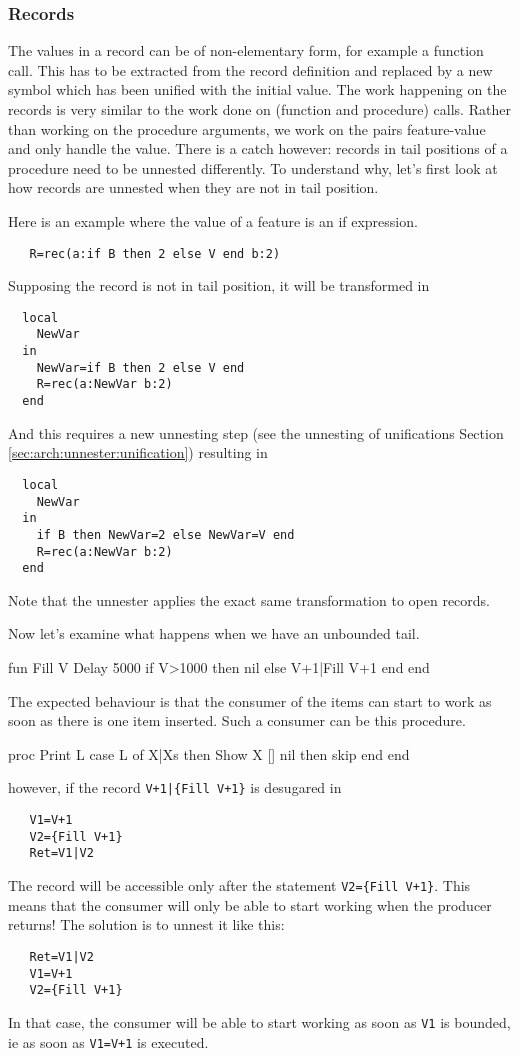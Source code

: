 \documentclass[a4paper]{memoir}
\begin{document}
\subsubsection{Records}\label{sec:arch:unnester:records}
The values in a record can be of non-elementary form, for example a function call. This has to be extracted from the record definition and replaced by a new symbol which has been unified with the initial value. The work happening on the records is very similar to the work done on (function and procedure) calls. Rather than working on the procedure arguments, we work on the pairs feature-value and only handle the value. 
There is a catch however: records in tail positions of a procedure need to be unnested
differently. To understand why, let's first look at how records are unnested
when they are not in tail position.

Here is an example where the value of a feature is an if expression.
\begin{lstlisting}
   R=rec(a:if B then 2 else V end b:2)
\end{lstlisting}
Supposing the record is not in tail position, it will be transformed in
\begin{lstlisting}
  local
    NewVar
  in
    NewVar=if B then 2 else V end
    R=rec(a:NewVar b:2)
  end
\end{lstlisting}
And this requires a new unnesting step (see the unnesting of unifications Section \ref{sec:arch:unnester:unification}) resulting in 
\begin{lstlisting}
  local
    NewVar
  in
    if B then NewVar=2 else NewVar=V end
    R=rec(a:NewVar b:2)
  end
\end{lstlisting}

Note that the unnester applies the exact same transformation to open records.

Now let's examine what happens when we have an unbounded tail.

   fun {Fill V}
      {Delay 5000} %
      if V>1000 then
	      nil
      else
         V+1|{Fill V+1}
      end
   end

The expected behaviour is that the consumer of the items can start to work as
soon as there is one item inserted. Such a consumer can be this procedure.

   proc {Print L}
      case L
      of X|Xs then
         {Show X}
      [] nil then
         skip
      end
   end

however, if the record \lstinline!V+1|{Fill V+1}! is desugared in 
\begin{lstlisting}
   V1=V+1
   V2={Fill V+1}
   Ret=V1|V2
\end{lstlisting}
The record will be accessible only after the statement 
\lstinline!V2={Fill V+1}!. This means that the consumer will only be able to start working when the
producer returns!
The solution is to unnest it like this:
\begin{lstlisting}
   Ret=V1|V2
   V1=V+1
   V2={Fill V+1}
\end{lstlisting}
In that case, the consumer will be able to start working as soon as
\lstinline!V1! is bounded, ie as soon as \lstinline!V1=V+1! is executed.
\end{document}
